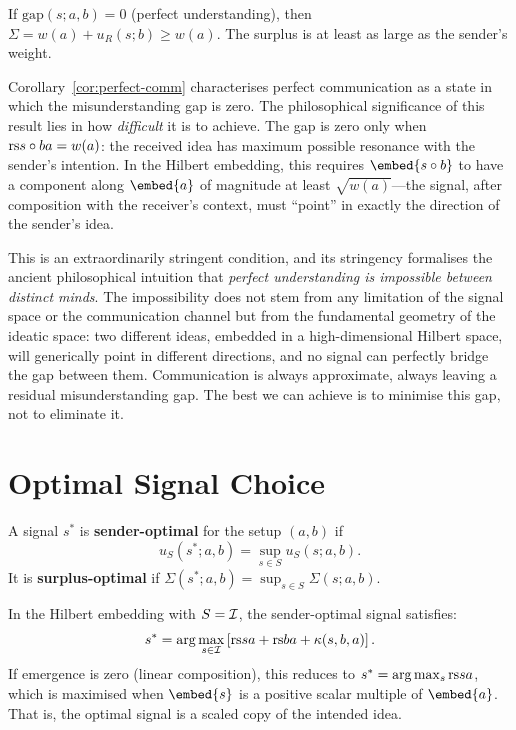 \begin{corollary}
\label{cor:perfect-comm}
If $\mathrm{gap}(s; a, b) = 0$ (perfect understanding), then
$\Sigma = w(a) + u_R(s; b) \geq w(a)$.
The surplus is at least as large as the sender's weight.
\end{corollary}

\begin{interpretation}
\label{interp:ch13:perfect_comm_impossible}
Corollary~\ref{cor:perfect-comm} characterises perfect communication as a
state in which the misunderstanding gap is zero.  The philosophical
significance of this result lies in how \emph{difficult} it is to achieve.
The gap is zero only when $\mathrm{rs}{s \circ b}{a} = w(a)$: the received idea
has maximum possible resonance with the sender's intention.  In the Hilbert
embedding, this requires $\embed{s \compose b}$ to have a component along
$\embed{a}$ of magnitude at least $\sqrt{w(a)}$---the signal, after
composition with the receiver's context, must ``point'' in exactly the
direction of the sender's idea.

This is an extraordinarily stringent condition, and its stringency formalises
the ancient philosophical intuition that \emph{perfect understanding is
impossible between distinct minds}.  The impossibility does not stem from
any limitation of the signal space or the communication channel but from
the fundamental geometry of the ideatic space: two different ideas,
embedded in a high-dimensional Hilbert space, will generically point in
different directions, and no signal can perfectly bridge the gap between
them.  Communication is always approximate, always leaving a residual
misunderstanding gap.  The best we can achieve is to minimise this gap,
not to eliminate it.
\end{interpretation}



\section{Optimal Signal Choice}

\begin{definition}
\label{def:optimal-signal}
A signal $s^*$ is \textbf{sender-optimal} for the setup $(a, b)$ if
\[
  u_S(s^*; a, b) = \sup_{s \in S} u_S(s; a, b).
\]
It is \textbf{surplus-optimal} if
$\Sigma(s^*; a, b) = \sup_{s \in S} \Sigma(s; a, b)$.
\end{definition}

\begin{proposition}
\label{prop:optimal-char}
In the Hilbert embedding with $S = \mathcal{I}$, the sender-optimal signal satisfies:
\[
  s^* = \arg\max_{s \in \mathcal{I}}
    \left[\mathrm{rs}{s}{a} + \mathrm{rs}{b}{a} + \kappa(s, b, a)\right].
\]
If emergence is zero (linear composition), this reduces to
$s^* = \arg\max_s \mathrm{rs}{s}{a}$, which is maximised when $\embed{s}$ is a
positive scalar multiple of $\embed{a}$.  That is, the optimal signal is
a scaled copy of the intended idea.
\end{proposition}

